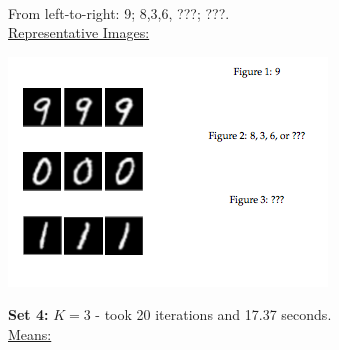 \documentclass[submit]{harvardml}
\begin{document}
\\\noindent From left-to-right: 9; 8,3,6, ???; ???. \\
\underline{Representative Images:}\\
	\centerline{\includegraphics[scale=0.55]{./ayy}}
\noindent\textbf{Set 4:} $K=3$ - took 20 iterations and 17.37 seconds. \\
\underline{Means:}\\
\end{document}
